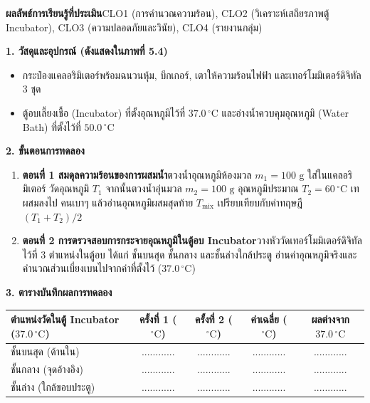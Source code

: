 \begin{labbox}
\noindent\textbf{ผลลัพธ์การเรียนรู้ที่ประเมิน}\quad CLO1 (การคำนวณความร้อน), CLO2 (วิเคราะห์เสถียรภาพตู้ Incubator), CLO3 (ความปลอดภัยและวินัย), CLO4 (รายงานกลุ่ม)

\vspace{4pt}
\noindent\textbf{1. วัสดุและอุปกรณ์ (ดังแสดงใน\mbox{ภาพที่} 5.4)}
\begin{itemize}
    \item กระป๋องแคลอริมิเตอร์พร้อมฉนวนหุ้ม, บีกเกอร์, เตาให้ความร้อนไฟฟ้า และเทอร์โมมิเตอร์ดิจิทัล 3 ชุด
    \item ตู้อบเลี้ยงเชื้อ (Incubator) ที่ตั้งอุณหภูมิไว้ที่ $37.0\,^\circ\text{C}$ และอ่างน้ำควบคุมอุณหภูมิ (Water Bath) ที่ตั้งไว้ที่ $50.0\,^\circ\text{C}$
\end{itemize}

\noindent\textbf{2. ขั้นตอนการทดลอง}
\begin{enumerate}
    \item \textbf{ตอนที่ 1 สมดุลความร้อนของการผสมน้ำ}\quad ตวงน้ำอุณหภูมิห้องมวล $m_1 = 100\text{ g}$ ใส่ในแคลอริมิเตอร์ วัดอุณหภูมิ $T_1$ จากนั้นตวงน้ำอุ่นมวล $m_2 = 100\text{ g}$ อุณหภูมิประมาณ $T_2 = 60\,^\circ\text{C}$ เทผสมลงไป คนเบาๆ แล้วอ่านอุณหภูมิผสมสุดท้าย $T_{\text{mix}}$ เปรียบเทียบกับค่าทฤษฎี $(T_1 + T_2)/2$
    \item \textbf{ตอนที่ 2 การตรวจสอบการกระจายอุณหภูมิในตู้อบ Incubator}\quad วางหัววัดเทอร์โมมิเตอร์ดิจิทัลไว้ที่ 3 ตำแหน่งในตู้อบ ได้แก่ ชั้นบนสุด ชั้นกลาง และชั้นล่างใกล้ประตู อ่านค่าอุณหภูมิจริงและคำนวณส่วนเบี่ยงเบนไปจากค่าที่ตั้งไว้ ($37.0\,^\circ\text{C}$)
\end{enumerate}

\noindent\textbf{3. ตารางบันทึกผลการทดลอง}
\begin{center}
\footnotesize\setlength{\tabcolsep}{3.5pt}
\begin{tabularx}{\linewidth}{>{\raggedright\arraybackslash}X c c c c}
\toprule
\textbf{ตำแหน่งวัดในตู้ Incubator ($37.0\,^\circ\text{C}$)} & \textbf{ครั้งที่ 1 ($^\circ\text{C}$)} & \textbf{ครั้งที่ 2 ($^\circ\text{C}$)} & \textbf{ค่าเฉลี่ย ($^\circ\text{C}$)} & \textbf{ผลต่างจาก $37.0\,^\circ\text{C}$} \\
\midrule
ชั้นบนสุด (ด้านใน) & ............ & ............ & ............ & ............ \\
ชั้นกลาง (จุดอ้างอิง) & ............ & ............ & ............ & ............ \\
ชั้นล่าง (ใกล้ขอบประตู) & ............ & ............ & ............ & ............ \\
\bottomrule
\end{tabularx}
\end{center}
\end{labbox}

